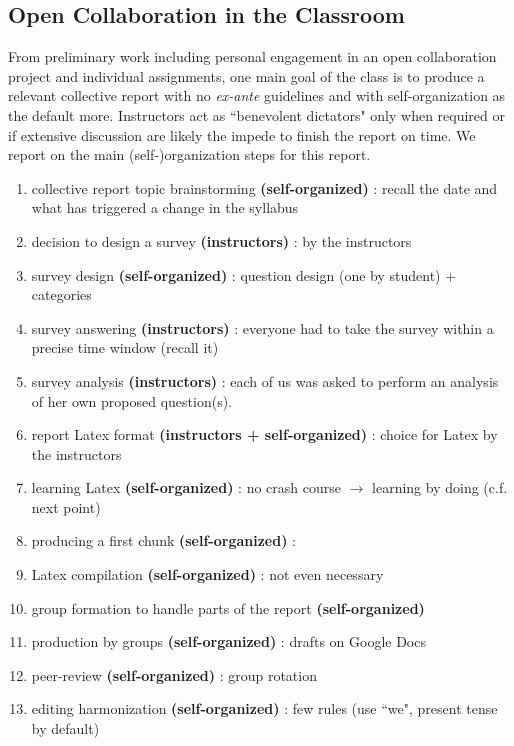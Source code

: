 \subsection{Open Collaboration in the Classroom}
\label{opencollaborationintheclassroom}

From preliminary work including personal engagement in an open collaboration project and individual assignments, one main goal of the class is to produce a relevant collective report with no {\it ex-ante} guidelines and with self-organization as the default more. Instructors act as ``benevolent dictators" only when required or if extensive discussion are likely the impede to finish the report on time. We report on the main (self-)organization steps for this report.

\begin{enumerate}
  \item collective report topic brainstorming {\bf (self-organized)} : recall the date and what has triggered a change in the syllabus
  \item decision to design a survey {\bf (instructors)} : by the instructors
  \item survey design {\bf (self-organized)} : question design (one by student) + categories
  \item survey answering {\bf (instructors)} : everyone had to take the survey within a precise time window (recall it)
  \item survey analysis {\bf (instructors)} :  each of us was asked to perform an analysis of her own proposed question(s).
  \item report Latex format {\bf (instructors + self-organized)} : choice for Latex by the instructors
  \item learning Latex {\bf (self-organized)} : no crash course $\rightarrow$  learning by doing (c.f. next point)
  \item producing a first chunk {\bf (self-organized)} :
  \item Latex compilation {\bf (self-organized)} : not even necessary  
  \item group formation to handle parts of the report {\bf (self-organized)}
  \item production by groups {\bf (self-organized)} : drafts on Google Docs
  \item peer-review {\bf (self-organized)} : group rotation
  \item editing harmonization {\bf (self-organized)} : few rules (use ``we", present tense by default)
\end{enumerate}


